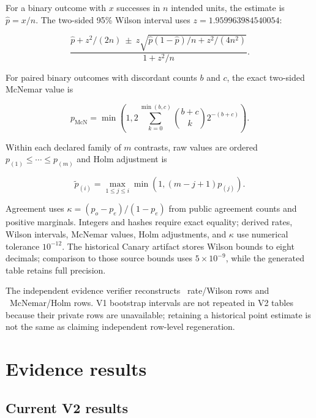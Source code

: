 \documentclass[10pt]{article}
\begin{document}
For a binary outcome with $x$ successes in $n$ intended units, the estimate is
$\hat p=x/n$. The two-sided 95\% Wilson interval uses
$z=1.959963984540054$:

\begin{equation}
\frac{\hat p+z^2/(2n)\ \pm\ z
\sqrt{\hat p(1-\hat p)/n+z^2/(4n^2)}}{1+z^2/n}.
\label{eq:wilson}
\end{equation}

For paired binary outcomes with discordant counts $b$ and $c$, the exact
two-sided McNemar value is

\begin{equation}
p_{\mathrm{McN}}=\min\!\left(1,
2\sum_{k=0}^{\min(b,c)} {b+c\choose k}2^{-(b+c)}\right).
\label{eq:mcnemar}
\end{equation}

Within each declared family of $m$ contrasts, raw values are ordered
$p_{(1)}\le\cdots\le p_{(m)}$ and Holm adjustment is

\begin{equation}
\widetilde p_{(i)}=\max_{1\le j\le i}
\min\!\left(1,(m-j+1)p_{(j)}\right).
\label{eq:holm}
\end{equation}

Agreement uses $\kappa=(p_o-p_e)/(1-p_e)$ from public agreement counts and
positive marginals. Integers and hashes require exact equality; derived rates,
Wilson intervals, McNemar values, Holm adjustments, and $\kappa$ use numerical
tolerance $10^{-12}$. The historical Canary artifact stores Wilson bounds to
eight decimals; comparison to those source bounds uses $5\times10^{-9}$, while
the generated table retains full precision.

The independent evidence verifier reconstructs \MutMemStatisticalRateRows\
rate/Wilson rows and \MutMemStatisticalInferenceRows\ McNemar/Holm rows. V1
bootstrap intervals are not repeated in V2 tables because their private rows are
unavailable; retaining a historical point estimate is not the same as claiming
independent row-level regeneration.

\section{Evidence results}



\subsection{Current V2 results}
\end{document}
